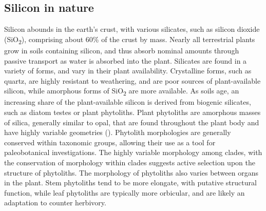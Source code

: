 \documentclass[12pt, letterpaper, ]{article}
\begin{document}
\subsection{Silicon in nature}

Silicon abounds in the earth’s crust, with various silicates, such as silicon dioxide (SiO\textsubscript{2}), comprising about 60\% of the crust by mass. Nearly all terrestrial plants grow in soils containing silicon, and thus absorb nominal amounts through passive transport as water is absorbed into the plant. Silicates are found in a variety of forms, and vary in their plant availability. Crystalline forms, such as quartz, are highly resistant to weathering, and are poor sources of plant-available silicon, while amorphous forms of SiO\textsubscript{2} are more available. As soils age, an increasing share of the plant-available silicon is derived from biogenic silicates, such as diatom testes or plant phytoliths. Plant phytoliths are amorphous masses of silica, generally similar to opal, that are found throughout the plant body and have highly variable geometries (\cite{piperno_phytoliths_2006}). Phytolith morphologies are generally conserved within taxonomic groups, allowing their use as a tool for paleobotanical investigations. The highly variable morphology among clades, with the conservation of morphology within clades suggests active selection upon the structure of phytoliths. The morphology of phytoliths also varies between organs in the plant. Stem phytoliths tend to be more elongate, with putative structural function, while leaf phytoliths are typically more orbicular, and are likely an adaptation to counter herbivory. 
\end{document}
